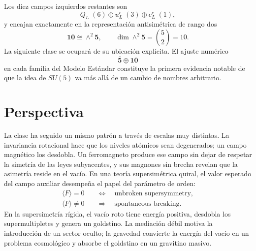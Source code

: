 Los diez campos izquierdos restantes son
\begin{equation}
Q_L\;(6)
\oplus
u^c_L\;(3)
\oplus
e^c_L\;(1),
\end{equation}
y encajan exactamente en la representación antisimétrica de rango dos
\begin{equation}
\mathbf{10}\cong\wedge^2\mathbf5,
\qquad
\dim\wedge^2\mathbf5=\binom52=10.
\label{eq:l9-ten-preview}
\end{equation}
La siguiente clase se ocupará de su ubicación explícita. El ajuste numérico
\begin{equation}
\overline{\mathbf5}\oplus\mathbf{10}
\end{equation}
en cada familia del Modelo Estándar constituye la primera evidencia notable de que la idea de \(SU(5)\) va más allá de un cambio de nombres arbitrario.

\begin{classroomqa}
\end{classroomqa}

\section{Perspectiva}

La clase ha seguido un mismo patrón a través de escalas muy distintas. La invariancia rotacional hace que los niveles atómicos sean degenerados; un campo magnético los desdobla. Un ferromagneto produce ese campo sin dejar de respetar la simetría de las leyes subyacentes, y sus magnones sin brecha revelan que la asimetría reside en el vacío. En una teoría supersimétrica quiral, el valor esperado del campo auxiliar desempeña el papel del parámetro de orden:
\begin{equation}
\begin{aligned}
\langle F\rangle=0
&\quad\Longleftrightarrow\quad
\text{unbroken supersymmetry},\\
\langle F\rangle\neq0
&\quad\Longrightarrow\quad
\text{spontaneous breaking}.
\end{aligned}
\end{equation}
En la supersimetría rígida, el vacío roto tiene energía positiva, desdobla los supermultipletes y genera un goldstino. La mediación débil motiva la introducción de un sector oculto; la gravedad convierte la energía del vacío en un problema cosmológico y absorbe el goldstino en un gravitino masivo.

